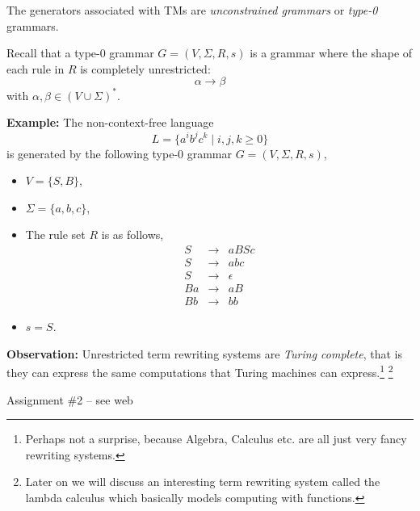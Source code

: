 \documentclass[a4paper,blends,pdf,colorBG,slideColor]{prosper}
\begin{document}

The generators associated with TMs are {\em unconstrained grammars} or {\em type-0} grammars.

Recall that a type-0 grammar $G=(V,\Sigma,R,s)$ is a grammar where the shape of each rule in $R$ is 
completely unrestricted:
\[
\alpha \rightarrow \beta
\]
with $\alpha, \beta \in (V\cup \Sigma)^*$.
\es

{\bf Example:}  The non-context-free language
\[
L= \{a^ib^jc^k \mid i,j,k \ge 0\}
\]
is generated by the following type-0 grammar $G = (V,\Sigma,R,s)$,
\begin{itemize}
\item $V = \{S,B\}$,
\item $\Sigma = \{a,b,c\}$,
\item The rule set $R$ is as follows,
\begin{eqnarray*}
S &\rightarrow& a B S c\\
S &\rightarrow& a b c\\
S &\rightarrow& \epsilon\\
Ba &\rightarrow& a B\\
Bb &\rightarrow& b b
\end{eqnarray*}
\item $s = S$.
\end{itemize}
\es

{\bf Observation:} Unrestricted term rewriting systems are {\em Turing complete}, that is they can express
the same computations that Turing machines can express.\footnote{Perhaps not a surprise, because Algebra,
Calculus etc. are all just very fancy rewriting systems.}
\footnote{Later on we will discuss an interesting term rewriting system called the lambda calculus which
basically models computing with functions.}
\es

Assignment \#2 -- see web
\es
\end{document}
